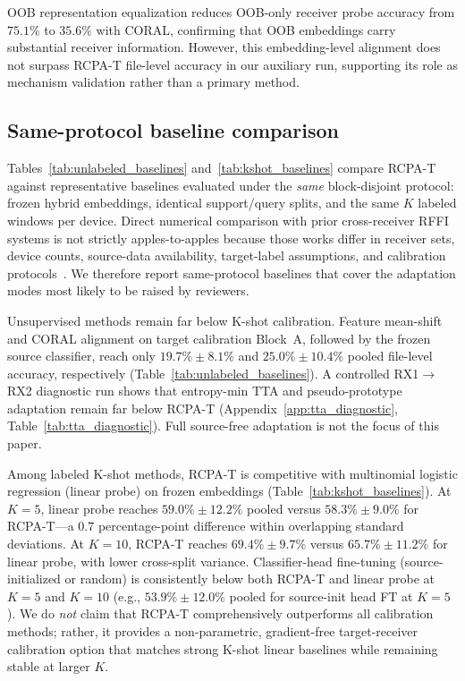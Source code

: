 OOB representation equalization reduces OOB-only receiver probe accuracy from $75.1\%$ to $35.6\%$ with CORAL, confirming that OOB embeddings carry substantial receiver information.
However, this embedding-level alignment does not surpass RCPA-T file-level accuracy in our auxiliary run, supporting its role as mechanism validation rather than a primary method.



\subsection{Same-protocol baseline comparison}
Tables~\ref{tab:unlabeled_baselines} and~\ref{tab:kshot_baselines} compare RCPA-T against representative baselines evaluated under the \emph{same} block-disjoint protocol: frozen hybrid embeddings, identical support/query splits, and the same $K$ labeled windows per device.
Direct numerical comparison with prior cross-receiver RFFI systems is not strictly apples-to-apples because those works differ in receiver sets, device counts, source-data availability, target-label assumptions, and calibration protocols~\cite{shen2024receiveragnostic,yang2025scrffi,ma2025receiver_independent_rffi}.
We therefore report same-protocol baselines that cover the adaptation modes most likely to be raised by reviewers.

Unsupervised methods remain far below K-shot calibration.
Feature mean-shift and CORAL alignment on target calibration Block~A, followed by the frozen source classifier, reach only $19.7\%\pm 8.1\%$ and $25.0\%\pm 10.4\%$ pooled file-level accuracy, respectively (Table~\ref{tab:unlabeled_baselines}).
A controlled RX1$\rightarrow$RX2 diagnostic run shows that entropy-min TTA and pseudo-prototype adaptation remain far below RCPA-T (Appendix~\ref{app:tta_diagnostic}, Table~\ref{tab:tta_diagnostic}).
Full source-free adaptation is not the focus of this paper.

Among labeled K-shot methods, RCPA-T is competitive with multinomial logistic regression (linear probe) on frozen embeddings (Table~\ref{tab:kshot_baselines}).
At $K{=}5$, linear probe reaches $59.0\%\pm 12.2\%$ pooled versus $58.3\%\pm 9.0\%$ for RCPA-T---a $0.7$ percentage-point difference within overlapping standard deviations.
At $K{=}10$, RCPA-T reaches $69.4\%\pm 9.7\%$ versus $65.7\%\pm 11.2\%$ for linear probe, with lower cross-split variance.
Classifier-head fine-tuning (source-initialized or random) is consistently below both RCPA-T and linear probe at $K{=}5$ and $K{=}10$ (e.g., $53.9\%\pm 12.0\%$ pooled for source-init head FT at $K{=}5$).
We do \emph{not} claim that RCPA-T comprehensively outperforms all calibration methods; rather, it provides a non-parametric, gradient-free target-receiver calibration option that matches strong K-shot linear baselines while remaining stable at larger $K$.


